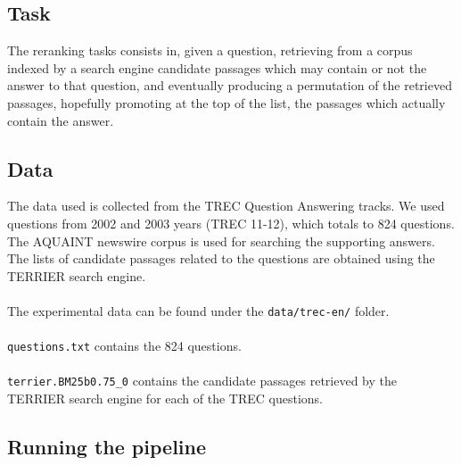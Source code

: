 \documentclass{wileysev}
\begin{document}
\subsection{Task}
The reranking tasks consists in, given a question, retrieving from a corpus indexed by a search engine candidate passages which may contain or not the answer to that question, and eventually producing a permutation of the retrieved passages, hopefully promoting at the top of the list, the passages which actually contain the answer.

\subsection{Data}

The data used is collected from the TREC Question Answering tracks. We used questions from 2002 and 2003 years (TREC 11-12), which totals to 824 questions. The AQUAINT newswire corpus is used for searching the supporting answers. The lists of candidate passages related to the questions are obtained using the TERRIER search engine.
\\\\
The experimental data can be found under the \texttt{data/trec-en/} folder.
\\\\
\texttt{questions.txt} contains the 824 questions.
\\\\
\texttt{terrier.BM25b0.75\_0} contains the candidate passages retrieved by the TERRIER search engine for each of the TREC questions.

\subsection{Running the pipeline}
\end{document}
